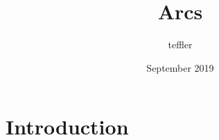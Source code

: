 \documentclass{article}
\title{Arcs}
\author{teffler }
\date{September 2019}
\begin{document}
\maketitle

\section{Introduction}
\end{document}
